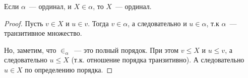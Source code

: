 \begin{proposition*}
    Если $\alpha$~--- ординал, и $X \in \alpha$, то $X$~--- ординал.
\end{proposition*}

\begin{proof}
    Пусть $v \in X$ и $u \in v$. Тогда $v \in \alpha$, а следовательно и $u \in \alpha$, т.к $\alpha$~---
    транзитивное множество.

    Но, заметим, что $\in_{\alpha}$~--- это полный порядок. При этом $v \le X$ и $u \le v$, а
    следовательно $u \le X$ (т.к. отношение порядка транзитивно). А следовательно $u \in X$ по
    определению порядка.
\end{proof}



